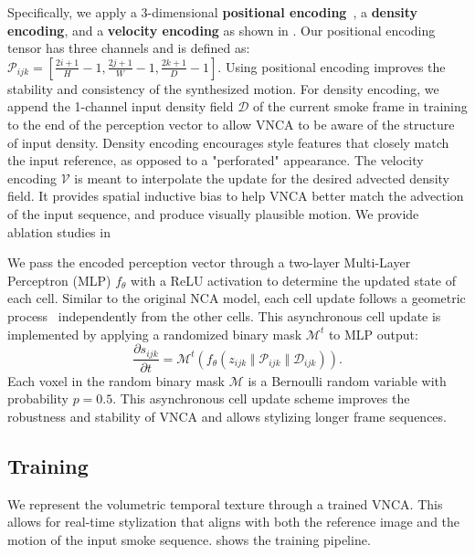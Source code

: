 Specifically, we apply a 3-dimensional \textbf{positional encoding}~\cite{pajouheshgar2023dynca}, a \textbf{density encoding}, and a \textbf{velocity encoding} as shown in . 
Our positional encoding tensor has three channels and is defined as: 
 $\mathcal{P}_{ijk} = \left[\frac{2i + 1}{H} - 1, \frac{2j + 1}{W} - 1, \frac{2k + 1}{D} -1 \right]. $
Using positional encoding improves the stability and consistency of the synthesized motion.  
For density encoding, we append the 1-channel input density field $\mathcal{D}$ of the current smoke frame in training to the end of the perception vector to allow VNCA to be aware of the structure of input density.
Density encoding encourages style features that closely match the input reference, as opposed to a "perforated" appearance. 
The velocity encoding $\mathcal{V}$ is meant to interpolate the update for the desired advected density field. 
It provides spatial inductive bias to help VNCA better match the advection of the input sequence, and produce visually plausible motion. We provide ablation studies in 


\medskip
{}
We pass the encoded perception vector through a two-layer Multi-Layer Perceptron (MLP) $f_\theta$ with a ReLU activation to determine the updated state of each cell. Similar to the original NCA model, each cell update follows a geometric process~\cite{geometric-process} independently from the other cells. 
This asynchronous cell update is implemented by applying a randomized binary mask $\mathcal{M}^t$ to MLP output:
\begin{equation}
    \frac{\partial s_{ijk}}{\partial t} = \mathcal{M}^t(f_\theta(z_{ijk} \; \Vert \; \mathcal{P}_{ijk}\; \Vert\; \mathcal{D}_{ijk})). 
\end{equation}
Each voxel in the random binary mask $\mathcal{M}$ is a Bernoulli random variable with probability $p=0.5$.
This asynchronous cell update scheme improves the robustness and stability of VNCA and allows stylizing longer frame sequences.


\subsection{Training}
\label{sec:opt}
We represent the volumetric temporal texture through a trained VNCA. 
This allows for real-time stylization that aligns with both the reference image and the motion of the input smoke sequence. 
 shows the training pipeline. 


